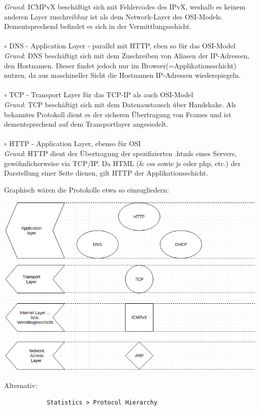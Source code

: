 \documentclass[11pt]{article}
\begin{document}
\begin{enumerate}[\thesection .1]
\begin{addmargin}[1em]{1em}
            \emph{Grund}: ICMPvX beschäftigt sich mit Fehlercodes des IPvX, weshalb es keinem anderen Layer zuschreibbar ist als dem Network-Layer des OSI-Models.
            Dementsprechend befindet es sich in der Vermittlungsschicht.\\\\
            $\circ$ DNS - Application Layer - parallel mit HTTP, eben so für das OSI-Model\\
            \emph{Grund}: DNS beschäftigt sich mit dem Zuschreiben von Aliasen der IP-Adressen, den Hostnamen.
            Dieser findet jedoch nur im Browser(=Applikationsschicht) nutzen, da aus maschineller Sicht die Hostnamen IP-Adressen wiederspiegeln.\\\\
            $\circ$ TCP - Transport Layer für das TCP-IP als auch OSI-Model\\
            \emph{Grund}: TCP beschäftigt sich mit dem Datenaustausch über Handshake. Als bekanntes Protokoll dient es der sicheren Übertragung von Frames
            und ist dementsprechend auf dem Transportlayer angesiedelt.\\\\
            $\circ$ HTTP - Application Layer, ebenso für OSI\\
            \emph{Grund}: HTTP dient der Übertragung der spezifizierten .htmls eines Servers, gewöhnlicherweise via TCP/IP.
            Da HTML (\& css sowie js oder php, etc.) der Darstellung einer Seite dienen, gilt HTTP der Applikationsschicht.
        \end{addmargin}
\pagebreak
        Graphisch wären die Protokolle etwa so einzugliedern:\\
        \begin{center}
            \includegraphics[width=\textwidth]{Modelization.png}
        \end{center}
        Alternativ:
        \begin{verbatim}
            Statistics > Protocol Hierarchy
        \end{verbatim}
    \end{enumerate}
\end{document}
